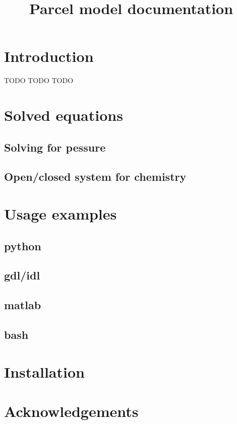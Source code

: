 \documentclass{article}
\date{} %
\title{Parcel model documentation}
\newcommand*\FancyVerbStartString{}
\newcommand*\FancyVerbStopString{}
\newcommand{\codepyt}[4]{%
  \refstepcounter{Listing}%
  \fvset{label=Listing~\theListing#4}%
  \fvset{gobble=#3}%
  \renewcommand*\FancyVerbStartString{\PY{c}{\PYZsh{}\PYZlt{}listing\PYZhy{}#2\PYZgt{}}}%
  \renewcommand*\FancyVerbStopString{\PY{c}{\PYZsh{}\PYZlt{}/listing\PYZhy{}#2\PYZgt{}}}%
  \vspace{-1.5em}%
}
\begin{document}
\twocolumn[
  \begin{@twocolumnfalse}
    \maketitle
  \end{@twocolumnfalse}
]

  \section{Introduction}\label{sec:intro}

TODO TODO TODO 

  \section{Solved equations}\label{sec:eqs}
    \subsection{Solving for pessure}

    


    \subsection{Open/closed system for chemistry}

  \section{Usage examples}
    \subsection{python}
    \subsection{gdl/idl}
    \subsection{matlab}
    \subsection{bash}
 
  
  \appendix

  \section{Installation}\label{sec:install}

  \section*{Acknowledgements}
  \footnotesize

  \renewcommand*{\bibfont}{\footnotesize}
  \printbibliography
\end{document}
